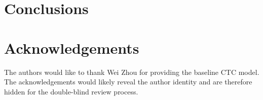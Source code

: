 \documentclass{INTERSPEECH2023}
\begin{document}
\section{Conclusions}

\section{Acknowledgements}

\ifinterspeechfinal
     The authors would like to thank Wei Zhou for providing the baseline \gls{CTC} model.
\else
     The acknowledgements would likely reveal the author identity and are therefore hidden for the double-blind review process.
\fi



\end{document}
